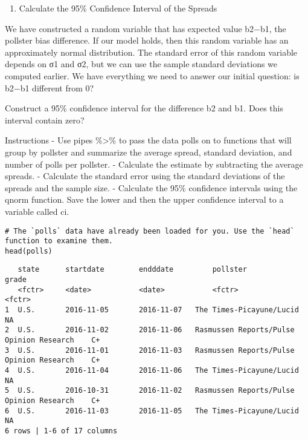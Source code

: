 \documentclass[
]{article}
\providecommand{\tightlist}{%
  \setlength{\itemsep}{0pt}\setlength{\parskip}{0pt}}
\begin{document}
\begin{enumerate}
\def\labelenumi{\arabic{enumi}.}
\setcounter{enumi}{14}
\tightlist
\item
  Calculate the 95\% Confidence Interval of the Spreads
\end{enumerate}

We have constructed a random variable that has expected value b2−b1, the
pollster bias difference. If our model holds, then this random variable
has an approximately normal distribution. The standard error of this
random variable depends on σ1 and σ2, but we can use the sample standard
deviations we computed earlier. We have everything we need to answer our
initial question: is b2−b1 different from 0?

Construct a 95\% confidence interval for the difference b2 and b1. Does
this interval contain zero?

Instructions - Use pipes \%\textgreater\% to pass the data polls on to
functions that will group by pollster and summarize the average spread,
standard deviation, and number of polls per pollster. - Calculate the
estimate by subtracting the average spreads. - Calculate the standard
error using the standard deviations of the spreads and the sample size.
- Calculate the 95\% confidence intervals using the qnorm function. Save
the lower and then the upper confidence interval to a variable called
ci.

\begin{verbatim}
# The `polls` data have already been loaded for you. Use the `head` function to examine them.
head(polls)
\end{verbatim}

\begin{verbatim}
   state      startdate        endddate         pollster                                        grade     
   <fctr>     <date>           <date>           <fctr>                                          <fctr>
1  U.S.       2016-11-05       2016-11-07   The Times-Picayune/Lucid                    NA  
2  U.S.       2016-11-02       2016-11-06   Rasmussen Reports/Pulse Opinion Research    C+  
3  U.S.       2016-11-01       2016-11-03   Rasmussen Reports/Pulse Opinion Research    C+  
4  U.S.       2016-11-04       2016-11-06   The Times-Picayune/Lucid                    NA  
5  U.S.       2016-10-31       2016-11-02   Rasmussen Reports/Pulse Opinion Research    C+  
6  U.S.       2016-11-03       2016-11-05   The Times-Picayune/Lucid                    NA  
6 rows | 1-6 of 17 columns
\end{verbatim}
\end{document}
